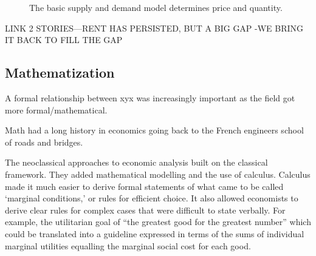  \begin{figure}[!ht]
\begin{center}
\caption{The basic supply and demand model determines price and quantity.}
\label{fig-equilibrium}
\end{center}
\end{figure}
LINK 2 STORIES---RENT HAS PERSISTED, BUT A BIG GAP -WE BRING IT BACK TO FILL THE GAP

\subsection{Mathematization}

A formal relationship between xyx was increasingly important as the field got more formal/mathematical.

Math had a long history in economics going back to the French engineers school of roads and bridges.



The \gls{neoclassical} approaches to economic analysis built on the classical framework. They added  mathematical modelling and the use of calculus. Calculus made it much easier to derive formal statements of what came to be called `marginal conditions,' or rules for efficient choice. It also allowed economists to derive clear rules for complex cases that were difficult to state verbally. For example, the utilitarian goal of ``the greatest good for the greatest number'' which %
could be translated into a guideline expressed in terms of the sums of individual marginal utilities equalling the marginal social cost for each good. 

